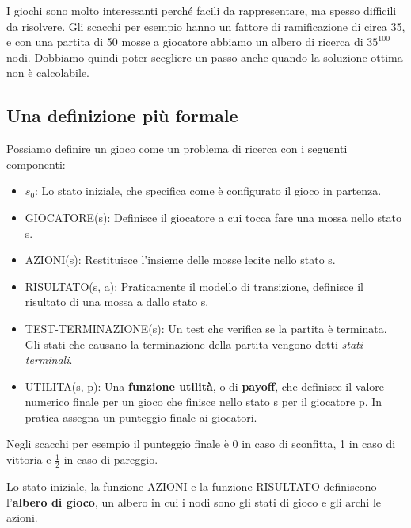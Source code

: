         I giochi sono molto interessanti perché facili da rappresentare, ma spesso difficili da risolvere. Gli scacchi per esempio hanno un fattore di ramificazione di circa 35, e con una partita di 50 mosse a giocatore abbiamo un albero di ricerca di $35^{100}$ nodi. Dobbiamo quindi poter scegliere un passo anche quando la soluzione ottima non è calcolabile.
            
    \subsection{Una definizione più formale}
        Possiamo definire un gioco come un problema di ricerca con i seguenti componenti:
        \begin{itemize}
            \item $s_0$: Lo stato iniziale, che specifica come è configurato il gioco in partenza.
                
            \item GIOCATORE(s): Definisce il giocatore a cui tocca fare una mossa nello stato s.
                
            \item AZIONI(s): Restituisce l'insieme delle mosse lecite nello stato s.
                
            \item RISULTATO(s, a): Praticamente il modello di transizione, definisce il risultato di una mossa a dallo stato s.
                
            \item TEST-TERMINAZIONE(s): Un test che verifica se la partita è terminata. Gli stati che causano la terminazione della partita vengono detti \textit{stati terminali}.
                
            \item UTILITA(s, p): Una \textbf{funzione utilità}, o di \textbf{payoff}, che definisce il valore numerico finale per un gioco che finisce nello stato s per il giocatore p. In pratica assegna un punteggio finale ai giocatori.
        \end{itemize}
            
        Negli scacchi per esempio il punteggio finale è 0 in caso di sconfitta, 1 in caso di vittoria e $\frac{1}{2}$ in caso di pareggio.
            
        Lo stato iniziale, la funzione AZIONI e la funzione RISULTATO definiscono l'\textbf{albero di gioco}, un albero in cui i nodi sono gli stati di gioco e gli archi le azioni.
            
